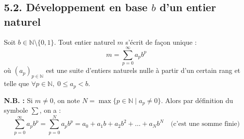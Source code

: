 \documentclass[a4paper,11pt]{article}
\newcommand{\N}{\mathbb{N}}
\begin{document}
\subsection{5.2. Développement en base $b$ d'un entier naturel}

\begin{theoreme}
Soit $b \in \N \setminus \{0,1\}$. Tout entier naturel $m$ s'écrit de façon unique :
$$ m = \sum_{p=0}^{\infty} a_p b^p $$
où $(a_p)_{p \in \N}$ est une suite d'entiers naturels nulle à partir d'un certain rang et telle que $\forall p \in \N, \; 0 \le a_p < b$.
\end{theoreme}

\begin{remarque}
\textbf{N.B. :} Si $m \neq 0$, on note $N = \max \{p \in \N \mid a_p \neq 0\}$. Alors par définition du symbole $\sum$, on a :
$$ \sum_{p=0}^{\infty} a_p b^p = \sum_{p=0}^N a_p b^p = a_0 + a_1 b + a_2 b^2 + \dots + a_N b^N \quad \text{(c'est une somme finie)} $$
\end{remarque}
\end{document}

